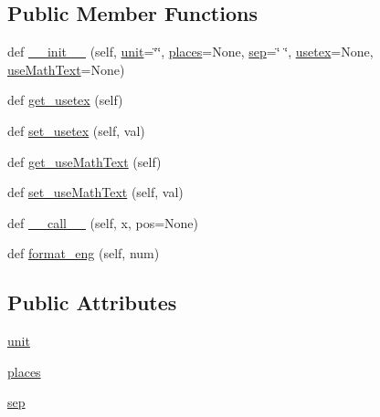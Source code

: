 \subsection*{Public Member Functions}
\begin{DoxyCompactItemize}
\item 
def \hyperlink{classmatplotlib_1_1ticker_1_1EngFormatter_add189dc36cfb426df61b149aa085e253}{\+\_\+\+\_\+init\+\_\+\+\_\+} (self, \hyperlink{classmatplotlib_1_1ticker_1_1EngFormatter_a071426bf19b85a557db9dc0cdbe43e65}{unit}=\char`\"{}\char`\"{}, \hyperlink{classmatplotlib_1_1ticker_1_1EngFormatter_a1f85c8740c0ab7171f86bbab69051e4e}{places}=None, \hyperlink{classmatplotlib_1_1ticker_1_1EngFormatter_a65b6f0e627d5064eee6d7a7f6b5a323d}{sep}=\char`\"{} \char`\"{}, \hyperlink{classmatplotlib_1_1ticker_1_1EngFormatter_a6c468506265aea1c1e318189b85ba090}{usetex}=None, \hyperlink{classmatplotlib_1_1ticker_1_1EngFormatter_a8563f9a8c3425646727df4047f76be6a}{use\+Math\+Text}=None)
\item 
def \hyperlink{classmatplotlib_1_1ticker_1_1EngFormatter_ad6bc6039174ded9f7c635daafb5a374b}{get\+\_\+usetex} (self)
\item 
def \hyperlink{classmatplotlib_1_1ticker_1_1EngFormatter_ab94e885a78e1664f26dce91fc3c57ea7}{set\+\_\+usetex} (self, val)
\item 
def \hyperlink{classmatplotlib_1_1ticker_1_1EngFormatter_a750de40e2dc3836c5a6cd3dd687628f2}{get\+\_\+use\+Math\+Text} (self)
\item 
def \hyperlink{classmatplotlib_1_1ticker_1_1EngFormatter_ad3f4d5a8f93c3359ae9803c4a514dfe1}{set\+\_\+use\+Math\+Text} (self, val)
\item 
def \hyperlink{classmatplotlib_1_1ticker_1_1EngFormatter_aebce169d028a8246dca5d657ab6d6ced}{\+\_\+\+\_\+call\+\_\+\+\_\+} (self, x, pos=None)
\item 
def \hyperlink{classmatplotlib_1_1ticker_1_1EngFormatter_ad8054fd4a729e453cbec5fe83a937808}{format\+\_\+eng} (self, num)
\end{DoxyCompactItemize}
\subsection*{Public Attributes}
\begin{DoxyCompactItemize}
\item 
\hyperlink{classmatplotlib_1_1ticker_1_1EngFormatter_a071426bf19b85a557db9dc0cdbe43e65}{unit}
\item 
\hyperlink{classmatplotlib_1_1ticker_1_1EngFormatter_a1f85c8740c0ab7171f86bbab69051e4e}{places}
\item 
\hyperlink{classmatplotlib_1_1ticker_1_1EngFormatter_a65b6f0e627d5064eee6d7a7f6b5a323d}{sep}
\end{DoxyCompactItemize}
